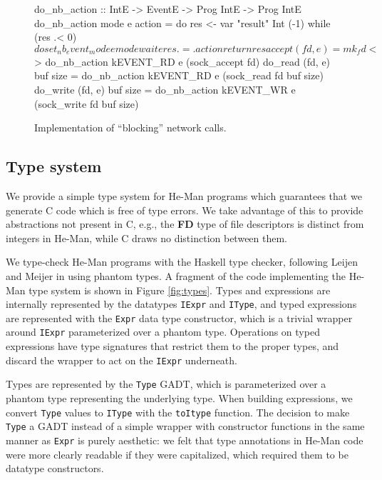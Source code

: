\documentclass[preprint]{sigplanconf}
\renewcommand{\t}{\texttt}
\renewcommand{\b}{\textbf}
\newenvironment{code}{\endgraf\small\verbatim}{\endverbatim}
\begin{document}
\begin{figure}[ht]
\centering
\begin{code}
do_nb_action :: IntE -> EventE -> Prog IntE
                -> Prog IntE
do_nb_action mode e action = do
  res <- var "result" Int (-1)
  while (res .< 0) $ do
    set_nb_event_mode e mode
    wait e
    res .=. action
  return res

accept (fd, e) =
  mk_fd <$> do_nb_action kEVENT_RD e (sock_accept fd)
do_read (fd, e) buf size =
  do_nb_action kEVENT_RD e (sock_read fd buf size)
do_write (fd, e) buf size =
  do_nb_action kEVENT_WR e (sock_write fd buf size)
\end{code}
\caption{Implementation of ``blocking'' network calls.}
\label{fig:generic}
\end{figure}

\subsection{Type system}

We provide a simple type system for He-Man programs which guarantees that we
generate C code which is free of type errors. We take advantage of this to
provide abstractions not present in C, e.g., the \b{FD} type of file descriptors
is distinct from integers in He-Man, while C draws no distinction between them.

We type-check He-Man programs with the Haskell type checker, following Leijen
and Meijer \cite{LeijenMeijer} in using phantom types. A fragment of the code
implementing the He-Man type system is shown in Figure \ref{fig:types}. Types
and expressions are internally represented by the datatypes \t{IExpr} and
\t{IType}, and typed expressions are represented with the \t{Expr} data type
constructor, which is a trivial wrapper around \t{IExpr} parameterized
over a phantom type. Operations on typed expressions have type signatures that
restrict them to the proper types, and discard the wrapper to act on the
\t{IExpr} underneath.

Types are represented by the \t{Type} GADT, which is parameterized over a
phantom type representing the underlying type. When building expressions, we
convert \t{Type} values to \t{IType} with the \t{toItype} function. The decision
to make \t{Type} a GADT instead of a simple wrapper with constructor functions
in the same manner as \t{Expr} is purely aesthetic: we felt that type
annotations in He-Man code were more clearly readable if they were capitalized,
which required them to be datatype constructors.
\end{document}
